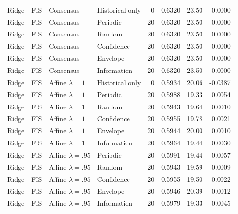 \begin{longtable}{llllrrrr}
Ridge & FIS & Consensus & Historical only & 0 & 0.6320 & 23.50 & 0.0000 \\
Ridge & FIS & Consensus & Periodic & 20 & 0.6320 & 23.50 & 0.0000 \\
Ridge & FIS & Consensus & Random & 20 & 0.6320 & 23.50 & -0.0000 \\
Ridge & FIS & Consensus & Confidence & 20 & 0.6320 & 23.50 & 0.0000 \\
Ridge & FIS & Consensus & Envelope & 20 & 0.6320 & 23.50 & 0.0000 \\
Ridge & FIS & Consensus & Information & 20 & 0.6320 & 23.50 & 0.0000 \\
Ridge & FIS & Affine $\lambda=1$ & Historical only & 0 & 0.5934 & 20.06 & -0.0387 \\
Ridge & FIS & Affine $\lambda=1$ & Periodic & 20 & 0.5988 & 19.33 & 0.0054 \\
Ridge & FIS & Affine $\lambda=1$ & Random & 20 & 0.5943 & 19.64 & 0.0010 \\
Ridge & FIS & Affine $\lambda=1$ & Confidence & 20 & 0.5955 & 19.78 & 0.0021 \\
Ridge & FIS & Affine $\lambda=1$ & Envelope & 20 & 0.5944 & 20.00 & 0.0010 \\
Ridge & FIS & Affine $\lambda=1$ & Information & 20 & 0.5964 & 19.44 & 0.0030 \\
Ridge & FIS & Affine $\lambda=.95$ & Periodic & 20 & 0.5991 & 19.44 & 0.0057 \\
Ridge & FIS & Affine $\lambda=.95$ & Random & 20 & 0.5943 & 19.59 & 0.0009 \\
Ridge & FIS & Affine $\lambda=.95$ & Confidence & 20 & 0.5955 & 19.50 & 0.0022 \\
Ridge & FIS & Affine $\lambda=.95$ & Envelope & 20 & 0.5946 & 20.39 & 0.0012 \\
Ridge & FIS & Affine $\lambda=.95$ & Information & 20 & 0.5979 & 19.33 & 0.0045 \\
\end{longtable}\normalsize
